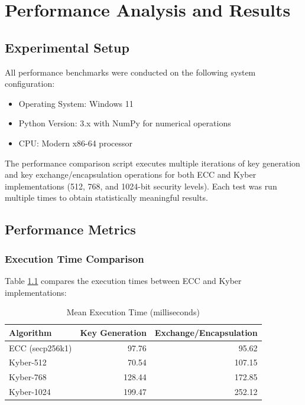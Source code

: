 \chapter{Performance Analysis and Results}

\section{Experimental Setup}

All performance benchmarks were conducted on the following system configuration:
\begin{itemize}
\item Operating System: Windows 11
\item Python Version: 3.x with NumPy for numerical operations
\item CPU: Modern x86-64 processor
\end{itemize}

The performance comparison script executes multiple iterations of key generation and key exchange/encapsulation operations for both ECC and Kyber implementations (512, 768, and 1024-bit security levels). Each test was run multiple times to obtain statistically meaningful results.

\section{Performance Metrics}

\subsection{Execution Time Comparison}

Table \ref{tab:exec-time} compares the execution times between ECC and Kyber implementations:

\begin{table}[!htbp]
\centering
\caption{\label{tab:exec-time}Mean Execution Time (milliseconds)}
\begin{tabular}{l|r|r}
\hline
\textbf{Algorithm} & \textbf{Key Generation} & \textbf{Exchange/Encapsulation} \\ \hline
ECC (secp256k1) & 97.76 & 95.62 \\
Kyber-512 & 70.54 & 107.15 \\
Kyber-768 & 128.44 & 172.85 \\
Kyber-1024 & 199.47 & 252.12 \\ \hline
\end{tabular}
\end{table}

